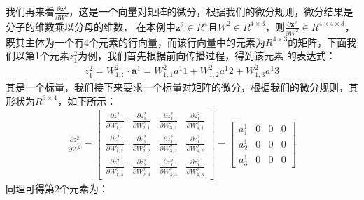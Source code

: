 我们再来看$\frac{\partial{ \boldsymbol{z}^{2} }} {\partial{ W^{2} }}$，这是一个向量对矩阵的微分，根据我们的微分规则，微分结果是分子的维数乘以分母的维数，
在本例中$\boldsymbol{z}^{2} \in R^{4}$且$W^{2} \in R^{4 \times 3}$，则$\frac{\partial{ \boldsymbol{z}^{2} }} {\partial{ W^{2} }} \in R^{4 \times 4 \times 3}$，
既其主体为一个有4个元素的行向量，而该行向量中的元素为$R^{4 \times 3}$的矩阵，下面我们以第1个元素$z^{2}_{1}$为例，我们首先根据前向传播过程，得到该元素
的表达式：
\begin{equation}
\begin{aligned}
z^{2}_{1} = W^{2}_{1,:} \cdot \boldsymbol{a}^{1} = W^{2}_{1,1}a^{1}{1} + W^{2}_{1,2}a^{1}{2} + W^{2}_{1,3}a^{1}{3}
\end{aligned}
\label{chpZ01-zwa-z21-formula}
\end{equation}
其是一个标量，我们接下来要求一个标量对矩阵的微分，根据我们的微分规则，其形状为$R^{3 \times 4}$，如下所示：
\begin{equation}
\begin{aligned}
\frac{\partial{z^{2}_{1}}} {\partial{W^{2}}} = \begin{bmatrix}
	\frac{\partial{z^{2}_{1}}} {\partial{W^{2}_{1,1}}} & \frac{\partial{z^{2}_{1}}} {\partial{W^{2}_{2,1}}} & \frac{\partial{z^{2}_{1}}} {\partial{W^{2}_{3,1}}} & \frac{\partial{z^{2}_{1}}} {\partial{W^{2}_{4,1}}} \\
	\frac{\partial{z^{2}_{1}}} {\partial{W^{2}_{1,2}}} & \frac{\partial{z^{2}_{1}}} {\partial{W^{2}_{2,2}}} & \frac{\partial{z^{2}_{1}}} {\partial{W^{2}_{3,2}}} & \frac{\partial{z^{2}_{1}}} {\partial{W^{2}_{4,2}}} \\
	\frac{\partial{z^{2}_{1}}} {\partial{W^{2}_{1,3}}} & \frac{\partial{z^{2}_{1}}} {\partial{W^{2}_{2,3}}} & \frac{\partial{z^{2}_{1}}} {\partial{W^{2}_{3,3}}} & \frac{\partial{z^{2}_{1}}} {\partial{W^{2}_{4,3}}} 
\end{bmatrix} = \begin{bmatrix}
	a^{1}_{1} & 0 & 0 & 0 \\
	a^{1}_{2} & 0 & 0 & 0 \\
	a^{1}_{3} & 0 & 0 & 0 
\end{bmatrix}
\end{aligned}
\label{chpZ01-zwa-z21-w2-1-def}
\end{equation}
同理可得第2个元素为：
